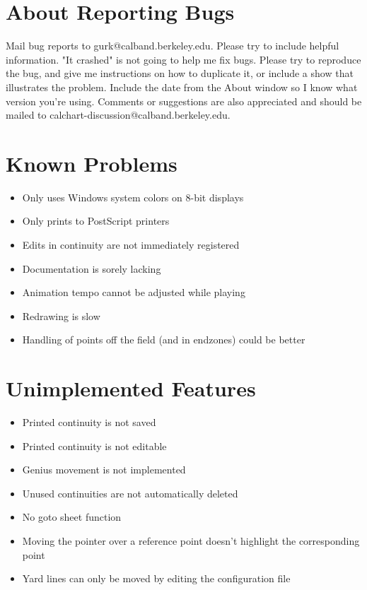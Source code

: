 \section{About Reporting Bugs}\label{reportingbugs}

Mail bug reports to gurk@calband.berkeley.edu.  Please try to include
helpful information.  "It crashed" is not going to help me fix bugs.
Please try to reproduce the bug, and give me instructions on how to
duplicate it, or include a show that illustrates the problem.  Include
the date from the About window so I know what version you're using.  Comments
or suggestions are also appreciated and should be mailed to
calchart-discussion@calband.berkeley.edu.

\section{Known Problems}\label{problems}

\begin{itemize}\itemsep=0pt
\item Only uses Windows system colors on 8-bit displays
\item Only prints to PostScript printers
\item Edits in continuity are not immediately registered
\item Documentation is sorely lacking
\item Animation tempo cannot be adjusted while playing
\item Redrawing is slow
\item Handling of points off the field (and in endzones) could be better
\end{itemize}

\section{Unimplemented Features}\label{notdone}

\begin{itemize}\itemsep=0pt
\item Printed continuity is not saved
\item Printed continuity is not editable
\item Genius movement is not implemented
\item Unused continuities are not automatically deleted
\item No goto sheet function
\item Moving the pointer over a reference point doesn't highlight the
corresponding point
\item Yard lines can only be moved by editing the configuration file
\end{itemize}
